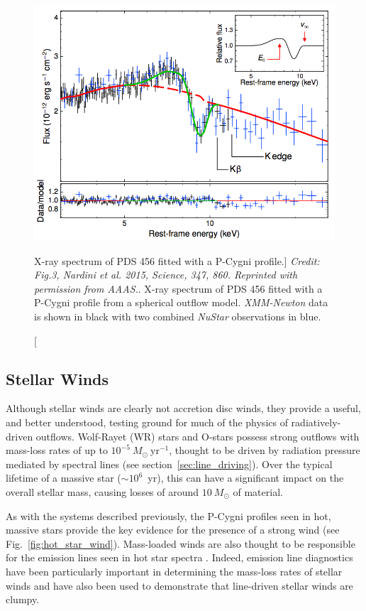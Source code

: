 \begin{figure}
\centering
\includegraphics[width=1.0\textwidth]{figures/02-outflows/nardini_pds456.png}
\caption
[X-ray spectrum of PDS 456 fitted with a P-Cygni profile.]
{
{\sl Credit: Fig.3, Nardini et al. 2015, Science, 347, 860. Reprinted with permission from AAAS.}. 
X-ray spectrum of PDS 456 fitted with a P-Cygni profile from a 
spherical outflow model. {\sl XMM-Newton} data is shown in black 
with two combined {\sl NuStar} observations in blue.
} 
\label{fig:nardini}
\end{figure}


\subsection{Stellar Winds}

\label{sec:stellar_winds}
Although stellar winds are clearly not accretion disc winds,
they provide a useful, and better understood, testing ground for much
of the physics of radiatively-driven outflows. 
Wolf-Rayet (WR) stars and O-stars possess strong outflows with mass-loss rates
of up to $10^{-5}~M_\odot~$yr$^{-1}$, thought to be driven by radiation pressure
mediated by spectral lines (see section~\ref{sec:line_driving}). 
Over the typical lifetime of a massive
star ($\sim10^6$~yr), this can have a significant impact on the overall stellar mass,
causing losses of around $10~M_\odot$ of material. 

As with the systems described previously, the P-Cygni profiles
seen in hot, massive stars provide the key evidence for the presence of
a strong wind (see Fig.~\ref{fig:hot_star_wind}). Mass-loaded
winds are also thought to be responsible for the emission lines 
seen in hot star spectra \citep[e.g.][]{pauldrach1994}. Indeed, emission
line diagnostics have been particularly important in determining
the mass-loss rates of stellar winds and have also been used to demonstrate 
that line-driven stellar winds are clumpy. 

